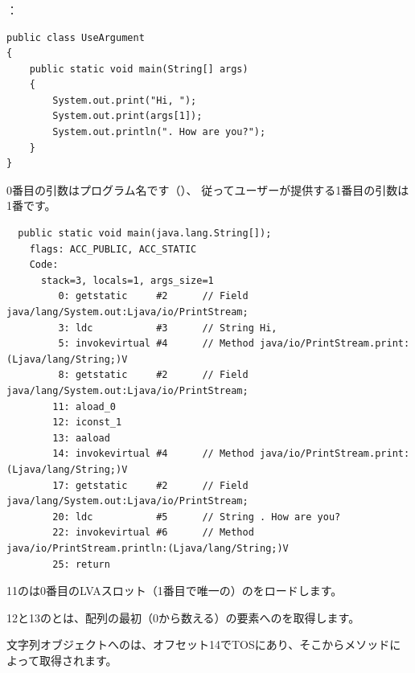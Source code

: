 \subsubsection{}

：


\begin{lstlisting}[style=customjava]
public class UseArgument
{
	public static void main(String[] args)
	{
		System.out.print("Hi, ");
		System.out.print(args[1]);
		System.out.println(". How are you?");
	}
}
\end{lstlisting}

0番目の引数はプログラム名です（）、
従ってユーザーが提供する1番目の引数は1番です。


\begin{lstlisting}
  public static void main(java.lang.String[]);
    flags: ACC_PUBLIC, ACC_STATIC
    Code:
      stack=3, locals=1, args_size=1
         0: getstatic     #2      // Field java/lang/System.out:Ljava/io/PrintStream;
         3: ldc           #3      // String Hi, 
         5: invokevirtual #4      // Method java/io/PrintStream.print:(Ljava/lang/String;)V
         8: getstatic     #2      // Field java/lang/System.out:Ljava/io/PrintStream;
        11: aload_0       
        12: iconst_1      
        13: aaload        
        14: invokevirtual #4      // Method java/io/PrintStream.print:(Ljava/lang/String;)V
        17: getstatic     #2      // Field java/lang/System.out:Ljava/io/PrintStream;
        20: ldc           #5      // String . How are you?
        22: invokevirtual #6      // Method java/io/PrintStream.println:(Ljava/lang/String;)V
        25: return        
\end{lstlisting}

11のは0番目の\ac{LVA}スロット（1番目で唯一の）のをロードします。

12と13のとは、配列の最初（0から数える）の要素へのを取得します。

文字列オブジェクトへのは、オフセット14で\ac{TOS}にあり、そこからメソッドによって取得されます。